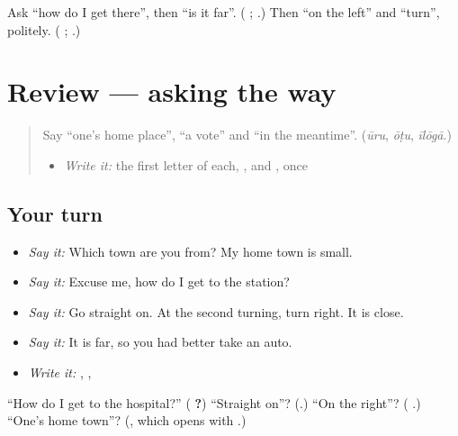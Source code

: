 \begin{tcolorbox}[breakable,colback=teal!4,colframe=teal!35!black,title={Before you move on}]
Ask \textquotedblleft{}how do I get there\textquotedblright{}, then \textquotedblleft{}is it far\textquotedblright{}. (\textbf{ }; \textbf{}.) Then \textquotedblleft{}on the left\textquotedblright{} and \textquotedblleft{}turn\textquotedblright{}, politely. (\textbf{ }; \textbf{}.)
\end{tcolorbox}
\section[(review)]{Review — asking the way}

\label{lesson:TE-R320-asking-the-way}



\begin{quote}
Say \textquotedblleft{}one's home place\textquotedblright{}, \textquotedblleft{}a vote\textquotedblright{} and \textquotedblleft{}in the meantime\textquotedblright{}. (\emph{ūru}, \emph{ōṭu}, \emph{īlōgā}.)

\begin{itemize}
\raggedright
  \item \emph{Write it:} the first letter of each, \textbf{}, \textbf{} and \textbf{}, once
\end{itemize}
\end{quote}

\subsection*{Your turn}
\begin{itemize}
\raggedright
  \item \emph{Say it:} Which town are you from? My home town is small.
  \item \emph{Say it:} Excuse me, how do I get to the station?
  \item \emph{Say it:} Go straight on. At the second turning, turn right. It is close.
  \item \emph{Say it:} It is far, so you had better take an auto.
  \item \emph{Write it:} \textbf{}, \textbf{}, \textbf{}
\end{itemize}

\begin{tcolorbox}[breakable,colback=teal!4,colframe=teal!35!black,title={Before you move on}]
\textquotedblleft{}How do I get to the hospital?\textquotedblright{} (\textbf{  ?}) \textquotedblleft{}Straight on\textquotedblright{}? (\textbf{}.) \textquotedblleft{}On the right\textquotedblright{}? (\textbf{ }.) \textquotedblleft{}One's home town\textquotedblright{}? (\textbf{}, which opens with \textbf{}.)
\end{tcolorbox}
